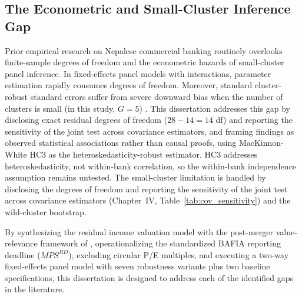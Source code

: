 \subsection{The Econometric and Small-Cluster Inference Gap}
Prior empirical research on Nepalese commercial banking routinely overlooks finite-sample degrees of freedom and the econometric hazards of small-cluster panel inference. In fixed-effects panel models with interactions, parameter estimation rapidly consumes degrees of freedom. Moreover, standard cluster-robust standard errors suffer from severe downward bias when the number of clusters is small (in this study, $G = 5$) \citep{cameron2008clusters}. This dissertation addresses this gap by disclosing exact residual degrees of freedom ($28 - 14 = 14$ df) and reporting the sensitivity of the joint test across covariance estimators, and framing findings as observed statistical associations rather than causal proofs, using MacKinnon-White HC3 as the heteroskedasticity-robust estimator. HC3 addresses heteroskedasticity, not within-bank correlation, so the within-bank independence assumption remains untested. The small-cluster limitation is handled by disclosing the degrees of freedom and reporting the sensitivity of the joint test across covariance estimators (Chapter~IV, Table~\ref{tab:cov_sensitivity}) and the wild-cluster bootstrap.

By synthesizing the \citet{ohlson1995} residual income valuation model with the post-merger value-relevance framework of \citet{kwon2020}, operationalizing the standardized BAFIA reporting deadline ($\mathit{MPS}^{RD}$), excluding circular P/E multiples, and executing a two-way fixed-effects panel model with seven robustness variants plus two baseline specifications, this dissertation is designed to address each of the identified gaps in the literature.


